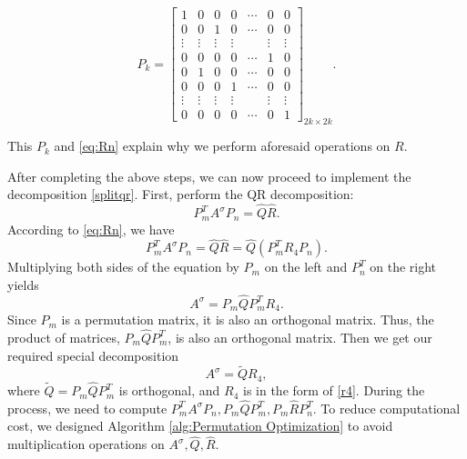 \documentclass{book}
\makeatletter
\def\my@tag@font{\normalsize}
\let\amsmath@eqref\eqref
\renewcommand\eqref[1]{{\let\my@tag@font\relax\amsmath@eqref{#1}}}
\theoremstyle{remark}
\makeatother
\begin{document}
\begin{multicols}{2}
\begin{equation}\label{p}
    P_k = \begin{bmatrix} 
            1 & 0 & 0 & 0 & \cdots & 0 & 0\\ 
            0 & 0 & 1 & 0 & \cdots & 0 & 0\\ 
            \vdots & \vdots & \vdots & \vdots &  & \vdots & \vdots\\ 
            0 & 0 & 0 & 0 & \cdots & 1 & 0 \\
            0 & 1 & 0 & 0 & \cdots & 0 & 0\\ 
            0 & 0 & 0 & 1 & \cdots & 0 & 0\\ 
            \vdots & \vdots & \vdots & \vdots &  & \vdots & \vdots\\ 
            0 & 0 & 0 & 0 &\cdots & 0 & 1 
        \end{bmatrix}_{2k \times 2k}.
\end{equation}

This $P_k$ and \eqref{eq:Rn} explain why we perform aforesaid operations on $R$.

After completing the above steps, we can now proceed to implement the decomposition \eqref{splitqr}.
First, perform the QR decomposition:
\[P_m^TA^\sigma P_n = \widehat{Q}\widehat{R}.\]
According to \eqref{eq:Rn}, we have
\[P_m^TA^\sigma P_n = \widehat{Q}\widehat{R} = \widehat{Q}(P_m^TR_4P_n).\]
Multiplying both sides of the equation by $P_m$ on the left and $P_n^T$ on the right yields
\[A^\sigma=P_m\widehat{Q}P_m^T R_4.\]
 Since $P_m$ is a permutation matrix, it is also an orthogonal matrix. Thus, the product of matrices, $P_m\widehat{Q}P_m^T$, is also an orthogonal matrix. Then we get our required special decomposition \[A^\sigma=\widetilde{Q}R_4,\] where $\widetilde{Q}=P_m\widehat{Q}P_m^T$ is orthogonal, and $R_4$ is in the form of \eqref{r4}. During the process, we need to compute 
$P_m^TA^\sigma P_n, P_m\widehat{Q}P_m^T, P_m \widehat{R}P_n^T$. To reduce computational cost, we designed Algorithm \ref{alg:Permutation Optimization} to avoid multiplication operations on $A^\sigma, \widehat{Q}, \widehat{R}$.

\end{multicols}
\end{document}
